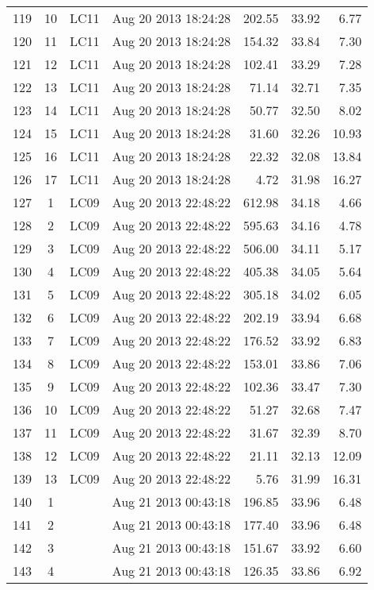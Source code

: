\documentclass{article}
\begin{document}
\begin{longtable}{ccllrrr}
119 & 10 & LC11 & Aug 20 2013 18:24:28 & 202.55 & 33.92 & 6.77 \\
120 & 11 & LC11 & Aug 20 2013 18:24:28 & 154.32 & 33.84 & 7.30 \\
121 & 12 & LC11 & Aug 20 2013 18:24:28 & 102.41 & 33.29 & 7.28 \\
122 & 13 & LC11 & Aug 20 2013 18:24:28 & 71.14 & 32.71 & 7.35 \\
123 & 14 & LC11 & Aug 20 2013 18:24:28 & 50.77 & 32.50 & 8.02 \\
124 & 15 & LC11 & Aug 20 2013 18:24:28 & 31.60 & 32.26 & 10.93 \\
125 & 16 & LC11 & Aug 20 2013 18:24:28 & 22.32 & 32.08 & 13.84 \\
126 & 17 & LC11 & Aug 20 2013 18:24:28 & 4.72 & 31.98 & 16.27 \\
\hline
127 & 1 & LC09 & Aug 20 2013 22:48:22 & 612.98 & 34.18 & 4.66 \\
128 & 2 & LC09 & Aug 20 2013 22:48:22 & 595.63 & 34.16 & 4.78 \\
129 & 3 & LC09 & Aug 20 2013 22:48:22 & 506.00 & 34.11 & 5.17 \\
130 & 4 & LC09 & Aug 20 2013 22:48:22 & 405.38 & 34.05 & 5.64 \\
131 & 5 & LC09 & Aug 20 2013 22:48:22 & 305.18 & 34.02 & 6.05 \\
132 & 6 & LC09 & Aug 20 2013 22:48:22 & 202.19 & 33.94 & 6.68 \\
133 & 7 & LC09 & Aug 20 2013 22:48:22 & 176.52 & 33.92 & 6.83 \\
134 & 8 & LC09 & Aug 20 2013 22:48:22 & 153.01 & 33.86 & 7.06 \\
135 & 9 & LC09 & Aug 20 2013 22:48:22 & 102.36 & 33.47 & 7.30 \\
136 & 10 & LC09 & Aug 20 2013 22:48:22 & 51.27 & 32.68 & 7.47 \\
137 & 11 & LC09 & Aug 20 2013 22:48:22 & 31.67 & 32.39 & 8.70 \\
138 & 12 & LC09 & Aug 20 2013 22:48:22 & 21.11 & 32.13 & 12.09 \\
139 & 13 & LC09 & Aug 20 2013 22:48:22 & 5.76 & 31.99 & 16.31 \\
\hline
140 & 1 &  & Aug 21 2013 00:43:18 & 196.85 & 33.96 & 6.48 \\
141 & 2 &  & Aug 21 2013 00:43:18 & 177.40 & 33.96 & 6.48 \\
142 & 3 &  & Aug 21 2013 00:43:18 & 151.67 & 33.92 & 6.60 \\
143 & 4 &  & Aug 21 2013 00:43:18 & 126.35 & 33.86 & 6.92 \\

\end{longtable}
\end{document}
